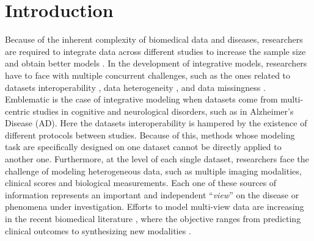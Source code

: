 \section{Introduction}

Because of the inherent complexity of biomedical data and diseases,
researchers are required to integrate data across different studies to increase the sample size and obtain better models \citep{LeSueur2020}.
%
In the development of integrative models, researchers have to face with multiple concurrent challenges, such as the ones related to
datasets interoperability \citep{Tognin2020},
data heterogeneity \citep{Buch2020},
and data missingness \citep{GolrizKhatami2020}.
%
Emblematic is the case of integrative modeling when datasets come from multi-centric studies in cognitive and neurological disorders,
such as in Alzheimer's Disease (AD).
%
Here the datasets interoperability is hampered by the existence of different protocols between studies.
Because of this, methods whose modeling task are specifically designed on one dataset cannot be directly applied to another one.
Furthermore, at the level of each single dataset, researchers face the challenge of modeling heterogeneous data,
such as multiple imaging modalities, clinical scores and biological measurements.
Each one of these sources of information represents an important and independent ``\textit{view}'' on the disease or phenomena under investigation.
Efforts to model multi-view data are increasing in the recent biomedical literature \citep{Vieira2020,Venugopalan2021},
where the objective ranges from predicting clinical outcomes \citep{Chen2019,AbiNader2020,Tabarestani2020}
to synthesizing new modalities \citep{Zhou2020, Wei2020}.


